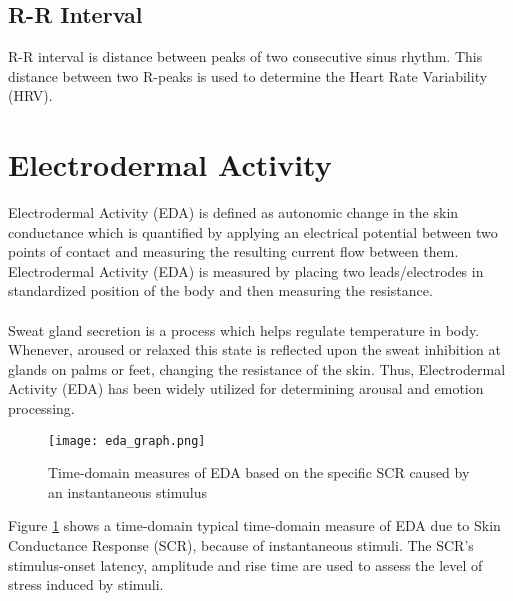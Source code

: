 \subsection{R-R Interval}
R-R interval is distance between peaks of two consecutive sinus rhythm. This distance between two R-peaks is used to determine the Heart Rate Variability (HRV).


\section{Electrodermal Activity}
Electrodermal Activity (EDA) is defined as autonomic change in the skin conductance which is quantified by applying an electrical potential between two points of contact and measuring the resulting current flow between them. Electrodermal Activity (EDA) is measured by placing two leads/electrodes in standardized position of the body and then measuring the resistance.
\paragraph{}
Sweat gland secretion is a process which helps regulate temperature in body. Whenever, aroused or relaxed this state is reflected upon the sweat inhibition at glands on palms or feet, changing the resistance of the skin. Thus, Electrodermal Activity (EDA) has been widely utilized for determining arousal and emotion processing.

\begin{figure}
	\centering
	\texttt{[image: eda\_graph.png]}
	\caption{Time-domain measures of EDA based on the specific SCR caused by an instantaneous stimulus}
	\label{fig:eda_graph}
\end{figure}

Figure \ref{fig:eda_graph} shows a time-domain typical time-domain measure of EDA due to Skin Conductance Response (SCR), because of instantaneous stimuli. The SCR’s stimulus-onset latency, amplitude and rise time are used to assess the level of stress induced by stimuli. 






